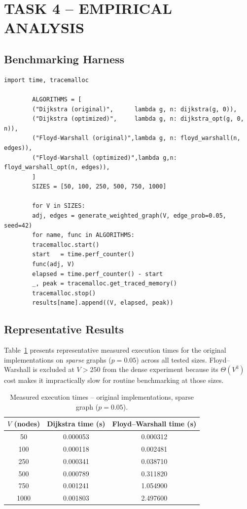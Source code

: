 \documentclass[12pt,a4paper]{article}
\begin{document}
	\section{TASK 4 -- EMPIRICAL ANALYSIS}
	
	\subsection{Benchmarking Harness}
	
	\begin{lstlisting}[caption={Benchmarking loop -- all variants timed on identical graph copies.}]
		import time, tracemalloc
		
		ALGORITHMS = [
		("Dijkstra (original)",      lambda g, n: dijkstra(g, 0)),
		("Dijkstra (optimized)",     lambda g, n: dijkstra_opt(g, 0, n)),
		("Floyd-Warshall (original)",lambda g, n: floyd_warshall(n, edges)),
		("Floyd-Warshall (optimized)",lambda g,n: floyd_warshall_opt(n, edges)),
		]
		SIZES = [50, 100, 250, 500, 750, 1000]
		
		for V in SIZES:
		adj, edges = generate_weighted_graph(V, edge_prob=0.05, seed=42)
		for name, func in ALGORITHMS:
		tracemalloc.start()
		start   = time.perf_counter()
		func(adj, V)
		elapsed = time.perf_counter() - start
		_, peak = tracemalloc.get_traced_memory()
		tracemalloc.stop()
		results[name].append((V, elapsed, peak))
	\end{lstlisting}
	
	\subsection{Representative Results}
	
	Table~\ref{tab:results_sparse} presents representative measured execution times
	for the original implementations on \emph{sparse} graphs ($p = 0.05$) across
	all tested sizes. Floyd--Warshall is excluded at $V > 250$ from the dense
	experiment because its $\Theta(V^3)$ cost makes it impractically slow for
	routine benchmarking at those sizes.
	
	\begin{table}[h!]
		\centering
		\caption{Measured execution times -- original implementations, sparse graph ($p=0.05$).}
		\label{tab:results_sparse}
		\renewcommand{\arraystretch}{1.3}
		\begin{tabular}{ccc}
			\toprule
			\textbf{$V$ (nodes)} & \textbf{Dijkstra time (s)} & \textbf{Floyd--Warshall time (s)} \\
			\midrule
			50   & 0.000053 & 0.000312 \\
			100  & 0.000118 & 0.002481 \\
			250  & 0.000341 & 0.038710 \\
			500  & 0.000789 & 0.311820 \\
			750  & 0.001241 & 1.054900 \\
			1000 & 0.001803 & 2.497600 \\
			\bottomrule
		\end{tabular}
	\end{table}
	
\end{document}
